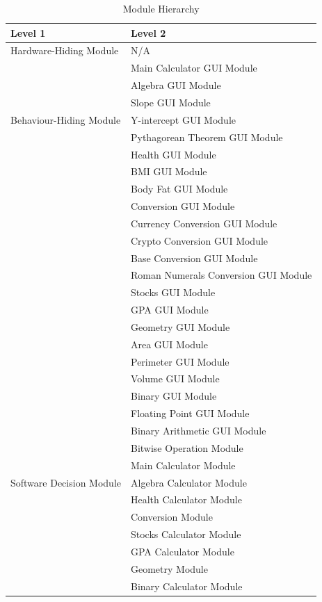 \documentclass[12pt, titlepage]{article}
\begin{document}
\begin{table}[H]
\centering
\begin{tabular}{p{} p{}}
\toprule
\textbf{Level 1} & \textbf{Level 2}\\
\midrule

{Hardware-Hiding Module} & N/A \\
\midrule

\multirow{7}{0.3\textwidth}{Behaviour-Hiding Module} & Main Calculator GUI Module\\
& Algebra GUI Module\\
& Slope GUI Module\\
& Y-intercept GUI Module\\
& Pythagorean Theorem GUI Module\\
& Health GUI Module\\ 
& BMI GUI Module\\
& Body Fat GUI Module\\
& Conversion GUI Module\\
& Currency Conversion GUI Module\\
& Crypto Conversion GUI Module\\
& Base Conversion GUI Module\\
& Roman Numerals Conversion GUI Module\\
& Stocks GUI Module\\
& GPA GUI Module\\
& Geometry GUI Module\\
& Area GUI Module\\
& Perimeter GUI Module\\
& Volume GUI Module\\
& Binary GUI Module\\
& Floating Point GUI Module\\
& Binary Arithmetic GUI Module\\
& Bitwise Operation Module\\


\midrule

\multirow{3}{0.3\textwidth}{Software Decision Module} & {Main Calculator Module}\\
& Algebra Calculator Module\\
& Health Calculator Module\\
& Conversion Module\\
& Stocks Calculator Module\\
& GPA Calculator Module\\
& Geometry Module\\
& Binary Calculator Module\\
\bottomrule

\end{tabular}
\caption{Module Hierarchy}
\label{TblMH}
\end{table}
\end{document}
